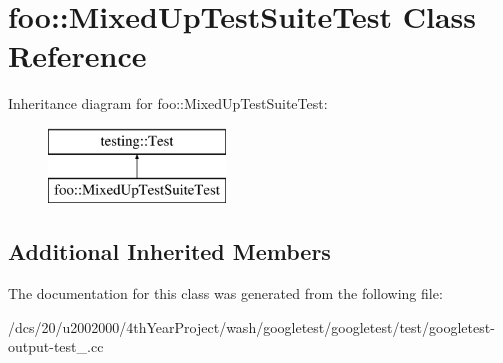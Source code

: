 \hypertarget{classfoo_1_1MixedUpTestSuiteTest}{}\section{foo\+:\+:Mixed\+Up\+Test\+Suite\+Test Class Reference}
\label{classfoo_1_1MixedUpTestSuiteTest}
Inheritance diagram for foo\+:\+:Mixed\+Up\+Test\+Suite\+Test\+:\begin{figure}[H]
\begin{center}
\leavevmode
\includegraphics[height=2.000000cm]{classfoo_1_1MixedUpTestSuiteTest}
\end{center}
\end{figure}
\subsection*{Additional Inherited Members}


The documentation for this class was generated from the following file\+:\begin{DoxyCompactItemize}
\item 
/dcs/20/u2002000/4th\+Year\+Project/wash/googletest/googletest/test/googletest-\/output-\/test\+\_\+.\+cc\end{DoxyCompactItemize}
